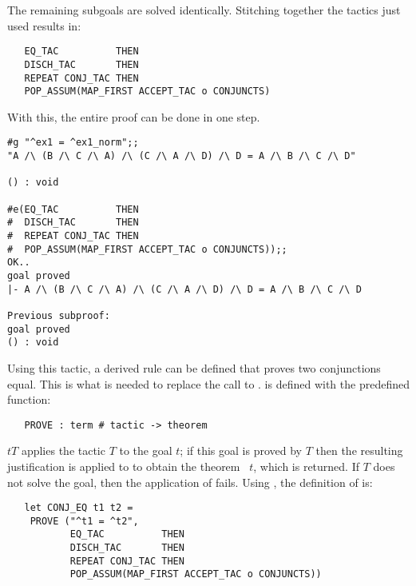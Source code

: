 \noindent The remaining subgoals are solved identically. Stitching together
the tactics just used results in:

\begin{hol}\begin{verbatim}
   EQ_TAC          THEN
   DISCH_TAC       THEN
   REPEAT CONJ_TAC THEN
   POP_ASSUM(MAP_FIRST ACCEPT_TAC o CONJUNCTS)
\end{verbatim}\end{hol}

\noindent With this, the entire proof can be done in one step.

\begin{session}\begin{verbatim}
#g "^ex1 = ^ex1_norm";;
"A /\ (B /\ C /\ A) /\ (C /\ A /\ D) /\ D = A /\ B /\ C /\ D"

() : void

#e(EQ_TAC          THEN
#  DISCH_TAC       THEN
#  REPEAT CONJ_TAC THEN
#  POP_ASSUM(MAP_FIRST ACCEPT_TAC o CONJUNCTS));;
OK..
goal proved
|- A /\ (B /\ C /\ A) /\ (C /\ A /\ D) /\ D = A /\ B /\ C /\ D

Previous subproof:
goal proved
() : void
\end{verbatim}\end{session}

Using this tactic, a derived rule  can be defined that proves
two conjunctions equal. This is what is needed to replace the call to
.
 is defined with the predefined function:

\begin{hol}\begin{verbatim}
   PROVE : term # tactic -> theorem
\end{verbatim}\end{hol}

\noindent {}\ml{(}$t$\ml{,}$T$\ml{)} applies the tactic $T$ to
the goal \ml{([],}$t$\ml{)}; if this goal is proved by $T$ then the
resulting justification is applied to \ml{[]} to obtain the theorem
\ml{|-}~$t$, which is returned. If $T$ does not solve the goal, then
the application of  fails. Using , the definition
of  is:

\begin{hol}\begin{verbatim}
   let CONJ_EQ t1 t2 =
    PROVE ("^t1 = ^t2",
           EQ_TAC          THEN
           DISCH_TAC       THEN
           REPEAT CONJ_TAC THEN
           POP_ASSUM(MAP_FIRST ACCEPT_TAC o CONJUNCTS))
\end{verbatim}\end{hol}


